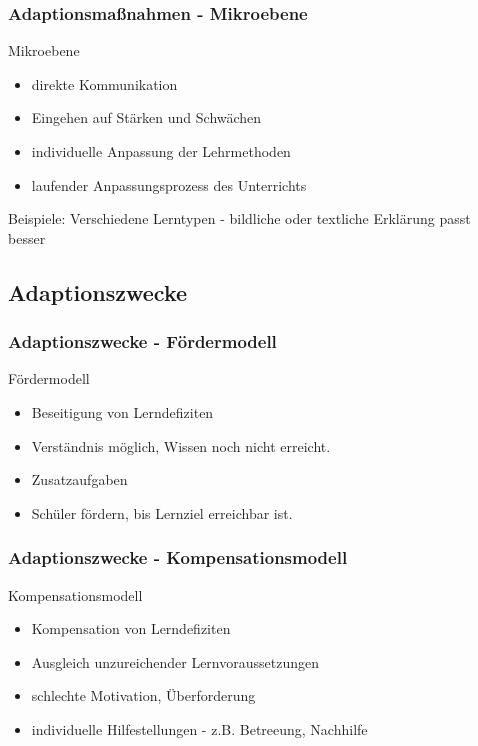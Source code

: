 \documentclass{beamer}
\begin{document}
\begin{frame}
  \frametitle{Adaptionsmaßnahmen - Mikroebene}
  \begin{block}{Mikroebene}
    \begin{itemize}
      \item direkte Kommunikation
      \item Eingehen auf Stärken und Schwächen
      \item individuelle Anpassung der Lehrmethoden
      \item laufender Anpassungsprozess des Unterrichts
    \end{itemize}
  \end{block}

  Beispiele: Verschiedene Lerntypen - bildliche oder textliche Erklärung passt besser
\end{frame}

\subsection{Adaptionszwecke}
\begin{frame}
  \frametitle{Adaptionszwecke - Fördermodell}
  \begin{block}{Fördermodell}
    \begin{itemize}
      \item Beseitigung von Lerndefiziten
      \item Verständnis möglich, Wissen noch nicht erreicht.
      \item Zusatzaufgaben
      \item Schüler fördern, bis Lernziel erreichbar ist.
    \end{itemize}
  \end{block}
\end{frame}

\begin{frame}
  \frametitle{Adaptionszwecke - Kompensationsmodell}
  \begin{block}{Kompensationsmodell}
    \begin{itemize}
      \item Kompensation von Lerndefiziten
      \item Ausgleich unzureichender Lernvoraussetzungen
      \item schlechte Motivation, Überforderung
      \item individuelle Hilfestellungen - z.B. Betreeung, Nachhilfe
    \end{itemize}
  \end{block}
\end{frame}
\end{document}
